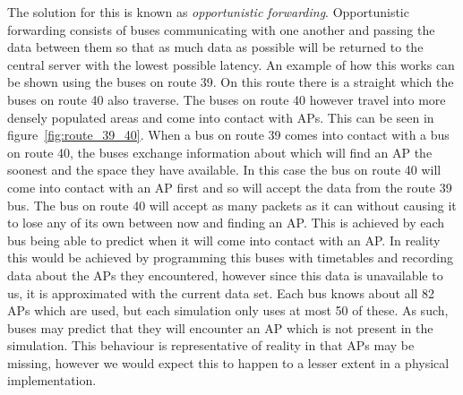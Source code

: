         The solution for this is known as \emph{opportunistic forwarding}. Opportunistic forwarding consists of buses communicating with one another and passing the data between them so that as much data as possible will be returned to the central server with the lowest possible latency. An example of how this works can be shown using the buses on route 39. On this route there is a straight which the buses on route 40 also traverse. The buses on route 40 however travel into more densely populated areas and come into contact with APs. This can be seen in figure~\ref{fig:route_39_40}. When a bus on route 39 comes into contact with a bus on route 40, the buses exchange information about which will find an AP the soonest and the space they have available. In this case the bus on route 40 will come into contact with an AP first and so will accept the data from the route 39 bus. The bus on route 40 will accept as many packets as it can without causing it to lose any of its own between now and finding an AP. This is achieved by each bus being able to predict when it will come into contact with an AP. In reality this would be achieved by programming this buses with timetables and recording data about the APs they encountered, however since this data is unavailable to us, it is approximated with the current data set. Each bus knows about all 82 APs which are used, but each simulation only uses at most 50 of these. As such, buses may predict that they will encounter an AP which is not present in the simulation. This behaviour is representative of reality in that APs may be missing, however we would expect this to happen to a lesser extent in a physical implementation.


